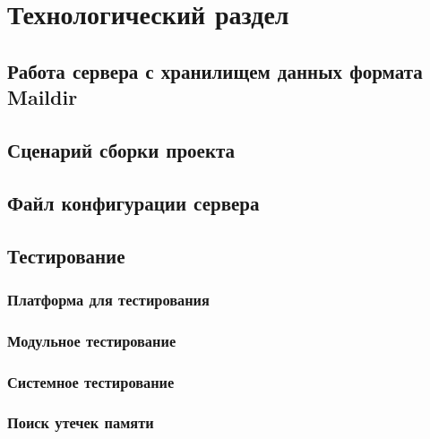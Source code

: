 \chapter{Технологический раздел}
\label{cha:implementation}

\section{Работа сервера с хранилищем данных формата Maildir}

\section{Сценарий сборки проекта}

\section{Файл конфигурации сервера}

\section{Тестирование}

\subsection{Платформа для тестирования}

\subsection{Модульное тестирование}

\subsection{Системное тестирование}

\subsection{Поиск утечек памяти}
